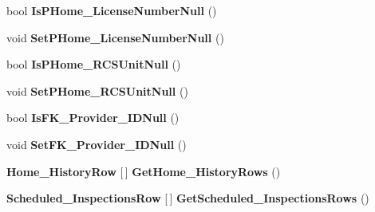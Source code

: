\begin{DoxyCompactItemize}
bool {\bfseries Is\+P\+Home\+\_\+\+License\+Number\+Null} ()
\item 
\mbox{\label{class_a_f_h___scheduler_1_1_home_inspection_data_set_1_1_provider___homes_row_abd445e1e23244d19eb9fb73bd8e833f1}} 
void {\bfseries Set\+P\+Home\+\_\+\+License\+Number\+Null} ()
\item 
\mbox{\label{class_a_f_h___scheduler_1_1_home_inspection_data_set_1_1_provider___homes_row_a97b36b4c8674a9caccb5203bf67d95cb}} 
bool {\bfseries Is\+P\+Home\+\_\+\+R\+C\+S\+Unit\+Null} ()
\item 
\mbox{\label{class_a_f_h___scheduler_1_1_home_inspection_data_set_1_1_provider___homes_row_a28cce22a885a4f78ea0c5523bf6bcd3e}} 
void {\bfseries Set\+P\+Home\+\_\+\+R\+C\+S\+Unit\+Null} ()
\item 
\mbox{\label{class_a_f_h___scheduler_1_1_home_inspection_data_set_1_1_provider___homes_row_afaa0be10bd63ce98137516ca824a5b35}} 
bool {\bfseries Is\+F\+K\+\_\+\+Provider\+\_\+\+I\+D\+Null} ()
\item 
\mbox{\label{class_a_f_h___scheduler_1_1_home_inspection_data_set_1_1_provider___homes_row_aec71fe47f783eebe463a80fb863762ca}} 
void {\bfseries Set\+F\+K\+\_\+\+Provider\+\_\+\+I\+D\+Null} ()
\item 
\mbox{\label{class_a_f_h___scheduler_1_1_home_inspection_data_set_1_1_provider___homes_row_a7c65e806f1decfb68a793cd272d3cef6}} 
\textbf{ Home\+\_\+\+History\+Row} [$\,$] {\bfseries Get\+Home\+\_\+\+History\+Rows} ()
\item 
\mbox{\label{class_a_f_h___scheduler_1_1_home_inspection_data_set_1_1_provider___homes_row_a9d6e363b4d1b141f588ec633aad52461}} 
\textbf{ Scheduled\+\_\+\+Inspections\+Row} [$\,$] {\bfseries Get\+Scheduled\+\_\+\+Inspections\+Rows} ()
\end{DoxyCompactItemize}
